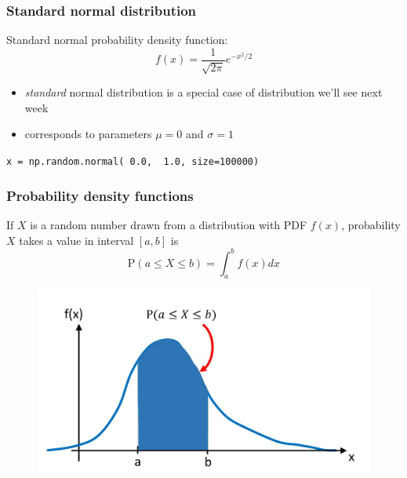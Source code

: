 \documentclass[english,14pt]{beamer}
\newcommand\red[1]{{\color{red} #1}}
\newcommand\blue[1]{{\color{blue} #1}}
\begin{document}

\begin{frame}[fragile]

\frametitle{Standard normal distribution}

Standard normal probability density function:
\[
\boxed{
f(x) = \frac{1}{\sqrt{2\pi}} e^{-x^2/2}}
\]

\begin{itemize}
	\item \emph{standard} normal distribution is a special case of distribution we'll see next week
	\item corresponds to parameters \red{$\mu = 0$} and \blue{$\sigma = 1$}
\end{itemize}

{\small
	\texttt{x = np.random.normal(\red{0.0}, \blue{1.0}, size=100000)}
}

\end{frame}


\begin{frame}[fragile]

\frametitle{Probability density functions}

If $X$ is a random number drawn from a distribution with PDF $f(x)$, probability $X$ takes a value in interval $[a,b]$ is
\vspace*{-2mm}
\[
	\boxed{
\mathrm{P}(a \leq X \leq b) = \int_a^b f(x) dx}
\]
\vspace*{-5mm}
\begin{figure}[ht]
	\centering
	\includegraphics[width=.7\textwidth]{figures/genericPDF}
\end{figure}

\end{frame}

\end{document}
